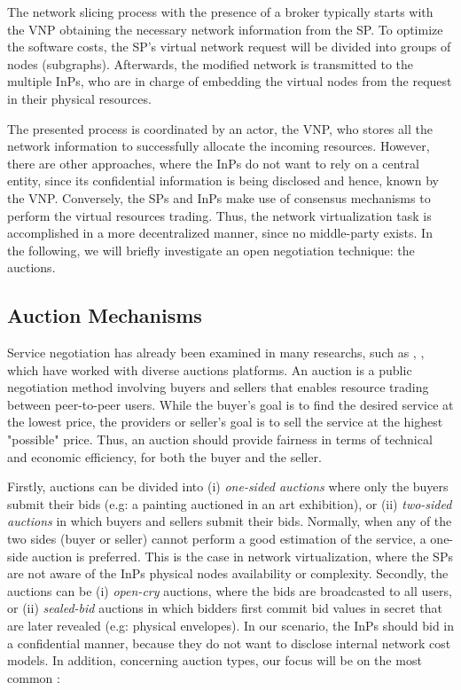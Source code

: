 The network slicing process with the presence of a broker typically starts with the VNP obtaining the necessary network information from the SP. To optimize the software costs, the SP's virtual network request will be divided into groups of nodes (subgraphs). Afterwards, the modified network is transmitted to the multiple InPs, who are in charge of embedding the virtual nodes from the request in their physical resources. 

The presented process is coordinated by an actor, the VNP, who stores all the network information to successfully allocate the incoming resources. However, there are other approaches, where the InPs do not want to rely on a central entity, since its confidential information is being disclosed and hence, known by the VNP. Conversely, the SPs and InPs make use of consensus mechanisms to perform the virtual resources trading. Thus, the network virtualization task is accomplished in a more decentralized manner, since no middle-party exists. In the following, we will briefly investigate an open negotiation technique: the auctions.

\subsection{Auction Mechanisms} \label{auctionMechanisms}

Service negotiation has already been examined in many researchs, such as \citep{hausheer2005peermart}, \cite{ogston2002peer}, which have worked with diverse auctions platforms. An auction is a public negotiation method involving buyers and sellers that enables resource trading between peer-to-peer users. While the buyer's goal is to find the desired service at the lowest price, the providers or seller's goal is to sell the service at the highest "possible" price. Thus, an auction should provide fairness in terms of technical and economic efficiency, for both the buyer and the seller.

Firstly, auctions can be divided into (i) \textit{one-sided auctions} where only the buyers submit their bids (e.g: a painting auctioned in an art exhibition), or (ii) \textit{two-sided auctions} in which buyers and sellers submit their bids. Normally, when any of the two sides (buyer or seller) cannot perform a good estimation of the service, a one-side auction is preferred. This is the case in network virtualization, where the SPs are not aware of the InPs physical nodes availability or complexity. Secondly, the auctions can be (i) \textit{open-cry} auctions, where the bids are broadcasted to all users, or (ii) \textit{sealed-bid} auctions in which bidders first commit bid values in secret that are later revealed (e.g: physical envelopes). In our scenario, the InPs should bid in a confidential manner, because they do not want to disclose internal network cost models. In addition, concerning auction types, our focus will be on the most common \cite{coppinger1980incentives}: 


